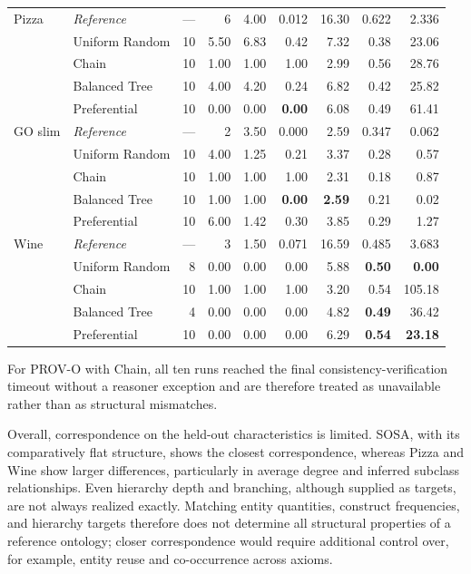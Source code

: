 {\begin{longtable}{llrrrrrrr}
Pizza & \textit{Reference} & --- & 6 & 4.00 & 0.012 & 16.30 & 0.622 & 2.336 \\
      & Uniform Random & 10 & 5.50 & 6.83 & 0.42 & 7.32 & 0.38 & 23.06 \\
      & Chain & 10 & 1.00 & 1.00 & 1.00 & 2.99 & 0.56 & 28.76 \\
      & Balanced Tree & 10 & 4.00 & 4.20 & 0.24 & 6.82 & 0.42 & 25.82 \\
      & Preferential & 10 & 0.00 & 0.00 & \textbf{0.00} &
        6.08 & 0.49 & 61.41 \\
\midrule

GO slim & \textit{Reference} & --- & 2 & 3.50 & 0.000 & 2.59 & 0.347 & 0.062 \\
        & Uniform Random & 10 & 4.00 & 1.25 & 0.21 & 3.37 & 0.28 & 0.57 \\
        & Chain & 10 & 1.00 & 1.00 & 1.00 & 2.31 & 0.18 & 0.87 \\
        & Balanced Tree & 10 & 1.00 & 1.00 & \textbf{0.00} &
          \textbf{2.59} & 0.21 & 0.02 \\
        & Preferential & 10 & 6.00 & 1.42 & 0.30 & 3.85 & 0.29 & 1.27 \\
\midrule

Wine & \textit{Reference} & --- & 3 & 1.50 & 0.071 & 16.59 & 0.485 & 3.683 \\
     & Uniform Random & 8 & 0.00 & 0.00 & 0.00 & 5.88 &
       \textbf{0.50} & \textbf{0.00} \\
     & Chain & 10 & 1.00 & 1.00 & 1.00 & 3.20 & 0.54 & 105.18 \\
     & Balanced Tree & 4 & 0.00 & 0.00 & 0.00 & 4.82 &
       \textbf{0.49} & 36.42 \\
     & Preferential & 10 & 0.00 & 0.00 & 0.00 & 6.29 &
       \textbf{0.54} & \textbf{23.18} \\

\end{longtable}
}

For PROV-O with Chain, all ten runs reached the final
consistency-verification timeout without a reasoner exception and are
therefore treated as unavailable rather than as structural mismatches.

Overall, correspondence on the held-out characteristics is limited. SOSA,
with its comparatively flat structure, shows the closest correspondence,
whereas Pizza and Wine show larger differences, particularly in average
degree and inferred subclass relationships. Even hierarchy depth and
branching, although supplied as targets, are not always realized exactly.
Matching entity quantities, construct frequencies, and hierarchy targets
therefore does not determine all structural properties of a reference
ontology; closer correspondence would require additional control over, for
example, entity reuse and co-occurrence across axioms.

